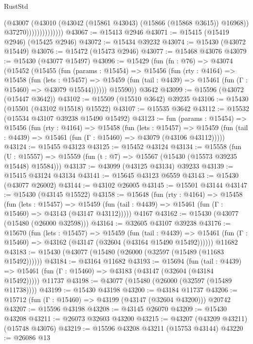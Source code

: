 \begin{lexlean}{RustStd}
\begin{coremodule}
{\begin{coremodule}
{{{{{{{{{{{{{{{{{{{{{{{{{{{{{{{{{{{{{{{{{{{{{{{{{{{{{{{{{{{{                              (@43007
                                (@43010 (@43042 (@15861 @43043) (@15866 (@15868 @3615)) @16968))
                                @37270))))))))))))))
@43067 := @15413 @2946
@43071 := @15415 (@15419 @2946) (@15425 @2946)
@43072 := @15434 @39232
@43074 := @15430 (@43072 @15449)
@43076 := @15472 (@15473 @2946)
@43077 := @15468 @43076
@43079 := @15430 (@43077 @15497)
@43096 := @15429
    (fun (fn : @76) =>
    @43074
      (@15452
        (@15455
          (fun (params : @15454) =>
          @15456
            (fun (rty : @4164) =>
            @15458
              (fun (lets : @15457) =>
              @15459 (fun (tail : @4439) => @15461 (fun (Γ : @15460) => @43079 @15544))))))
        @15590))
    @3642
@43099 := @15596 (@43072 (@15447 @3642))
@43102 := @15509 (@15510 @3642) @39235
@43106 := @15430 (@15501 (@43102 @15518) @15522)
@43107 := @15535 @3642
@43112 := @15532 (@15534 @43107 @39238 @15490 @15492)
@43123 := fun (params : @15454) =>
  @15456
    (fun (rty : @4164) =>
    @15458
      (fun (lets : @15457) =>
      @15459 (fun (tail : @4439) => @15461 (fun (Γ : @15460) => @43079 (@43106 @43112)))))
@43124 := @15455 @43123
@43125 := @15452 @43124
@43134 := @15558
    (fun (U : @15557) => @15559 (fun (t : @7) => @15567 (@15430 (@15573 @39235 @15448) @15584)))
@43137 := @43099 (@43125 @43134) @39233
@43139 := @15415 @43124 @43134
@43141 := @15645 @43123 @6559
@43143 := @15430 (@43077 @26002)
@43144 := @43102 @26005
@43145 := @15501 @43144
@43147 := @15430 (@43145 @15522)
@43158 := @15648
    (fun (rty : @4164) =>
    @15458
      (fun (lets : @15457) =>
      @15459 (fun (tail : @4439) => @15461 (fun (Γ : @15460) => @43143 (@43147 @43112)))))
    @4167
@43162 := @15430 (@43077 (@15480 (@26000 @32598)))
@43164 := @32605 @43107 @39238
@43176 := @15670
    (fun (lets : @15457) =>
    @15459
      (fun (tail : @4439) =>
      @15461 (fun (Γ : @15460) => @43162 (@43147 (@32604 (@43164 @15490 @15492))))))
    @11682
@43183 := @15430 (@43077 (@15480 (@26000 (@32597 (@15489 (@11683 @15492))))))
@43184 := @43164 @11682
@43193 := @15694
    (fun (tail : @4439) => @15461 (fun (Γ : @15460) => @43183 (@43147 (@32604 (@43184 @15492)))))
    @11737
@43198 := @43077 (@15480 (@26000 (@32597 (@15489 @11738))))
@43199 := @15430 @43198
@43200 := @43184 @11737
@43206 := @15712 (fun (Γ : @15460) => @43199 (@43147 (@32604 @43200))) @20742
@43207 := @15596 @43198
@43208 := @43145 @26070
@43209 := @15430 @43208
@43211 := @26073 @32603 @43200
@43215 := @43207 (@43209 @43211) (@15748 @43076)
@43219 := @15596 @43208 @43211 (@15753 @43144)
@43220 := @26086 @13
}}}}}}}}}}}}}}}}}}}}}}}}}}}}}}}}}}}}}}}}}}}}}}}}}}}}}}}}}}}}
\end{coremodule}}
\end{coremodule}
\end{lexlean}
